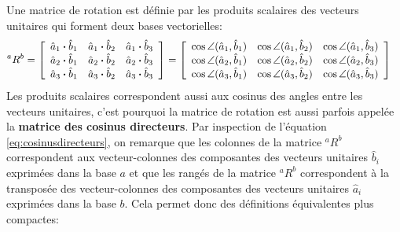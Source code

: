 Une matrice de rotation est définie par les produits scalaires des vecteurs unitaires qui forment deux bases vectorielles:
\begin{align}
{}^aR^b &= 
\left[ \begin{array}{c c c} 
\hat{a}_1 \bullet \hat{b}_1  &  \hat{a}_1 \bullet \hat{b}_2  &  \hat{a}_1 \bullet \hat{b}_3 \\
\hat{a}_2 \bullet \hat{b}_1  &  \hat{a}_2 \bullet \hat{b}_2  &  \hat{a}_2 \bullet \hat{b}_3 \\
\hat{a}_3 \bullet \hat{b}_1  &  \hat{a}_3 \bullet \hat{b}_2  &  \hat{a}_3 \bullet \hat{b}_3 
\end{array} \right] 
= 
\left[ \begin{array}{c c c} 
\cos \angle (\hat{a}_1 , \hat{b}_1)  &  \cos \angle (\hat{a}_1 , \hat{b}_2)  &  \cos \angle (\hat{a}_1 , \hat{b}_3) \\
\cos \angle (\hat{a}_2 , \hat{b}_1)  &  \cos \angle (\hat{a}_2 , \hat{b}_2)  &  \cos \angle (\hat{a}_2 , \hat{b}_3) \\
\cos \angle (\hat{a}_3 , \hat{b}_1)  &  \cos \angle (\hat{a}_3 , \hat{b}_2)  &  \cos \angle (\hat{a}_3 , \hat{b}_3) 
\end{array} \right]
\label{eq:cosinusdirecteurs}
\end{align} 
Les produits scalaires correspondent aussi aux cosinus des angles entre les vecteurs unitaires, c'est pourquoi la matrice de rotation est aussi parfois appelée la \textbf{matrice des cosinus directeurs}. Par inspection de l'équation \eqref{eq:cosinusdirecteurs}, on remarque que les colonnes de la matrice ${}^aR^b$ correspondent aux vecteur-colonnes des composantes des vecteurs unitaires $\hat{b}_i$ exprimées dans la base $a$ et que les rangés de la matrice ${}^aR^b$ correspondent à la transposée des vecteur-colonnes des composantes des vecteurs unitaires $\hat{a}_i$ exprimées dans la base $b$. Cela permet donc des définitions équivalentes plus compactes:
